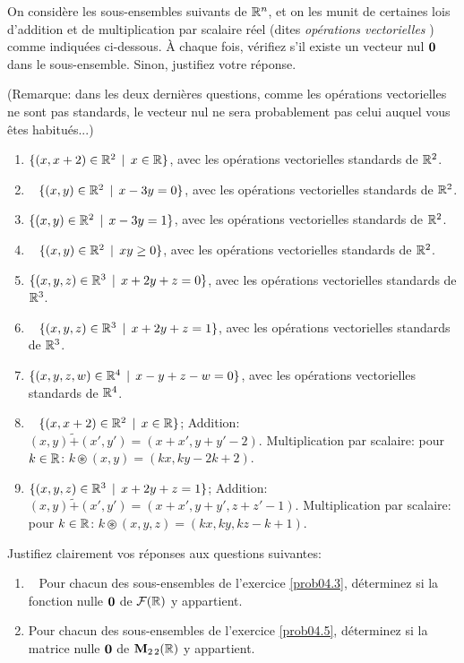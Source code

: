 \begin{prob} \label{prob04.7} On considère les sous-ensembles
suivants de $\mathbb{R}^n$, et on les munit de certaines lois d'addition et de
multiplication par scalaire réel (dites {\emph{ opérations vectorielles } }) comme indiquées ci-dessous. À chaque fois, vérifiez
s'il existe un vecteur nul $\mathbf{0}$ dans le sous-ensemble. Sinon, justifiez votre réponse.

(Remarque: dans les deux dernières questions, comme les opérations
vectorielles ne sont pas standards, le vecteur nul ne
sera probablement pas celui auquel vous êtes habitués...)

\begin{enumerate}
\item
  $\{(x, x+2) \in \mathbb{R}^2\, \mid \, x\in \mathbb{R}\}$, avec les opérations vectorielles
  standards de $\mathbb{R}^2$.
\item\sov~
  $\{(x, y) \in \mathbb{R}^2\, \mid \, x -3y=0 \}$, avec les opérations vectorielles
  standards de $\mathbb{R}^2$.
\item
  $\{(x, y) \in \mathbb{R}^2\, \mid \, x -3y=1 \}$, avec les opérations vectorielles
  standards de $\mathbb{R}^2$.
\item\sov~
  $\{(x, y) \in \mathbb{R}^2\, \mid \, xy \ge 0 \}$, avec les opérations vectorielles
  standards de $\mathbb{R}^2$.
\item
  $\{(x, y, z) \in \mathbb{R}^3\, \mid \, x+2y+z=0 \}$, avec les opérations vectorielles
  standards de $\mathbb{R}^3$.
\item\sov~
  $\{(x, y, z) \in \mathbb{R}^3\, \mid \, x+2y+z=1 \}$, avec les opérations vectorielles
  standards de $\mathbb{R}^3$.
\item
  $\{(x, y, z, w) \in \mathbb{R}^4\, \mid \, x-y+z-w=0 \}$, avec les opérations vectorielles
  standards de $\mathbb{R}^4$.
\item\sov~
  $\{(x, x+2) \in \mathbb{R}^2\, \mid \, x\in \mathbb{R}\}$; Addition:
  $(x,y) \tilde+ (x',y')=(x+x', y+y' -2)$. Multiplication par scalaire: pour $k\in \mathbb{R}$: $k\circledast (x,y)=(kx, ky-2k+2)$.
\item
  $\{(x, y, z) \in \mathbb{R}^3\, \mid \, x+2y+z=1 \}$; Addition:
  $(x,y) \tilde+ (x',y')=(x+x', y+y',z+z'-1)$. Multiplication par scalaire: pour $k\in \mathbb{R}$:
  $k\circledast (x,y,z)=(kx, ky, kz-k+1)$.
\end{enumerate}
\end{prob}

\begin{prob} \label{prob04.8} Justifiez clairement vos
réponses aux questions suivantes:

\begin{enumerate}
\item\sov~
  Pour chacun des
  sous-ensembles de l'exercice \ref{prob04.3}, déterminez si la fonction nulle $\mathbf{0}$ de $\mathcal{F}(\mathbb{R})$ y appartient.
\item
  Pour chacun des sous-ensembles de l'exercice \ref{prob04.5}, déterminez si la matrice nulle $\mathbf{0}$ de $\mathbf{M}_{2 \,2}(\mathbb{R})$ y appartient.
\end{enumerate}
\end{prob}

